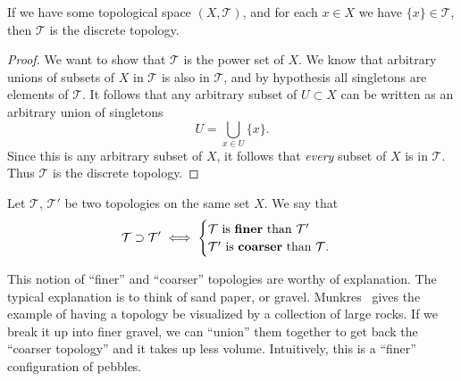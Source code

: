 \begin{prop}\label{prop:discreteTopologyFromSingletons}
  If we have some topological space $(X,\mathcal{T})$, and for
  each $x\in X$ we have $\{x\}\in\mathcal{T}$, then $\mathcal{T}$
  is the discrete topology.
\end{prop}
\begin{proof}
We want to show that $\mathcal{T}$ is the power set of $X$. We
know that arbitrary unions of subsets of $X$ in $\mathcal{T}$ is
also in $\mathcal{T}$, and by hypothesis all singletons are
elements of $\mathcal{T}$. It follows that any arbitrary subset
of $U\subset X$ can be written as an arbitrary union of
singletons
\begin{equation}
U = \bigcup_{x\in U} \{x\}.
\end{equation}
Since this is any arbitrary subset of $X$, it follows that
\emph{every} subset of $X$ is in $\mathcal{T}$. Thus
$\mathcal{T}$ is the discrete topology.
\end{proof}

\begin{defn}\label{defn:comparisonTopologies}
  Let $\mathcal{T}$, $\mathcal{T}'$ be two topologies on the same
  set $X$. We say that
\begin{equation}
\mathcal{T}\supset\mathcal{T}'\iff\begin{cases}
\mathcal{T}\text{ is \textbf{finer} than }\mathcal{T}'\\
\mathcal{T}'\text{ is \textbf{coarser} than }\mathcal{T}.
\end{cases}
\end{equation}
\end{defn}
\begin{rmk}
This notion of ``finer'' and ``coarser'' topologies are worthy of
explanation. The typical explanation is to think of sand paper,
or gravel. Munkres~\cite{munkres} gives the example of having a
topology be visualized by a collection of large rocks. If we
break it up into finer gravel, we can ``union'' them together to
get back the ``coarser topology'' and it takes up less
volume. Intuitively, this is a ``finer'' configuration of
pebbles. 
\end{rmk}

